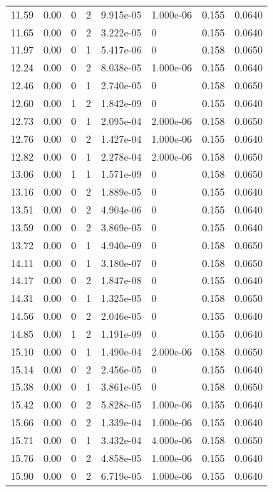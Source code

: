 \documentclass[preview]{standalone}
\begin{document}
{{{\begin{tabular}{L{1.2cm}C{1.2cm} C{0.3cm}C{0.5cm} C{1.4cm}C{1.4cm} C{1.4cm}C{1.4cm}}
  11.59  &  0.00  & 0     &  2 &  9.915e-05  & 1.000e-06  & 0.155 &  0.0640   \\ 
  11.65  &  0.00  & 0     &  2 &  3.222e-05  & 0  & 0.155 &  0.0640   \\ 
  11.97  &  0.00  & 0     &  1 &  5.417e-06  & 0  & 0.158 &  0.0650   \\ 
  12.24  &  0.00  & 0     &  2 &  8.038e-05  & 1.000e-06  & 0.155 &  0.0640   \\ 
  12.46  &  0.00  & 0     &  1 &  2.740e-05  & 0  & 0.158 &  0.0650   \\ 
  12.60  &  0.00  & 1     &  2 &  1.842e-09  & 0  & 0.155 &  0.0640   \\ 
  12.73  &  0.00  & 0     &  1 &  2.095e-04  & 2.000e-06  & 0.158 &  0.0650   \\ 
  12.76  &  0.00  & 0     &  2 &  1.427e-04  & 1.000e-06  & 0.155 &  0.0640   \\ 
  12.82  &  0.00  & 0     &  1 &  2.278e-04  & 2.000e-06  & 0.158 &  0.0650   \\ 
  13.06  &  0.00  & 1     &  1 &  1.571e-09  & 0  & 0.158 &  0.0650   \\ 
  13.16  &  0.00  & 0     &  2 &  1.889e-05  & 0  & 0.155 &  0.0640   \\ 
  13.51  &  0.00  & 0     &  2 &  4.904e-06  & 0  & 0.155 &  0.0640   \\ 
  13.59  &  0.00  & 0     &  2 &  3.869e-05  & 0  & 0.155 &  0.0640   \\ 
  13.72  &  0.00  & 0     &  1 &  4.940e-09  & 0  & 0.158 &  0.0650   \\ 
  14.11  &  0.00  & 0     &  1 &  3.180e-07  & 0  & 0.158 &  0.0650   \\ 
  14.17  &  0.00  & 0     &  2 &  1.847e-08  & 0  & 0.155 &  0.0640   \\ 
  14.31  &  0.00  & 0     &  1 &  1.325e-05  & 0  & 0.158 &  0.0650   \\ 
  14.56  &  0.00  & 0     &  2 &  2.046e-05  & 0  & 0.155 &  0.0640   \\ 
  14.85  &  0.00  & 1     &  2 &  1.191e-09  & 0  & 0.155 &  0.0640   \\ 
  15.10  &  0.00  & 0     &  1 &  1.490e-04  & 2.000e-06  & 0.158 &  0.0650   \\ 
  15.14  &  0.00  & 0     &  2 &  2.456e-05  & 0  & 0.155 &  0.0640   \\ 
  15.38  &  0.00  & 0     &  1 &  3.861e-05  & 0  & 0.158 &  0.0650   \\ 
  15.42  &  0.00  & 0     &  2 &  5.828e-05  & 1.000e-06  & 0.155 &  0.0640   \\ 
  15.66  &  0.00  & 0     &  2 &  1.339e-04  & 1.000e-06  & 0.155 &  0.0640   \\ 
  15.71  &  0.00  & 0     &  1 &  3.432e-04  & 4.000e-06  & 0.158 &  0.0650   \\ 
  15.76  &  0.00  & 0     &  2 &  4.858e-05  & 1.000e-06  & 0.155 &  0.0640   \\ 
  15.90  &  0.00  & 0     &  2 &  6.719e-05  & 1.000e-06  & 0.155 &  0.0640   \\ 
\hline 
\end{tabular} 

}}}
\end{document}
